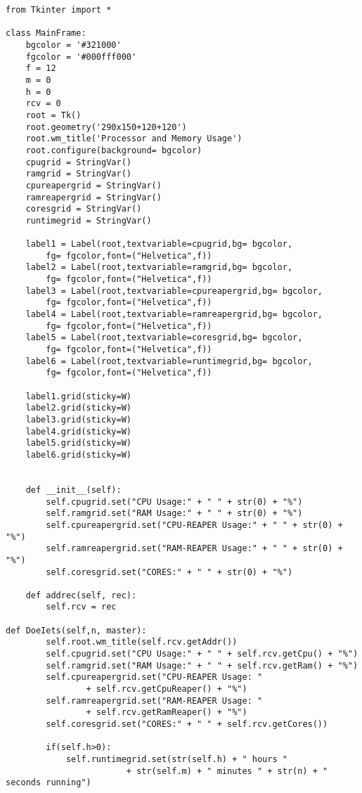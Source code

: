 \documentclass[DIV=calc]{scrartcl}
\begin{document}
\begin{lstlisting}[caption={pyhtonUI.py}, label=UI van het processor- en geheugengebruik van de server]
from Tkinter import *
 
class MainFrame:    
    bgcolor = '#321000'
    fgcolor = '#000fff000'
    f = 12
    m = 0
    h = 0
    rcv = 0
    root = Tk()
    root.geometry('290x150+120+120')
    root.wm_title('Processor and Memory Usage')
    root.configure(background= bgcolor)
    cpugrid = StringVar()
    ramgrid = StringVar()
    cpureapergrid = StringVar()
    ramreapergrid = StringVar()
    coresgrid = StringVar()
    runtimegrid = StringVar()
 
    label1 = Label(root,textvariable=cpugrid,bg= bgcolor,
		fg= fgcolor,font=("Helvetica",f))
    label2 = Label(root,textvariable=ramgrid,bg= bgcolor,
		fg= fgcolor,font=("Helvetica",f))
    label3 = Label(root,textvariable=cpureapergrid,bg= bgcolor,
		fg= fgcolor,font=("Helvetica",f))
    label4 = Label(root,textvariable=ramreapergrid,bg= bgcolor,
		fg= fgcolor,font=("Helvetica",f))
    label5 = Label(root,textvariable=coresgrid,bg= bgcolor,
		fg= fgcolor,font=("Helvetica",f))
    label6 = Label(root,textvariable=runtimegrid,bg= bgcolor,
		fg= fgcolor,font=("Helvetica",f))
 
    label1.grid(sticky=W)
    label2.grid(sticky=W)
    label3.grid(sticky=W)
    label4.grid(sticky=W)
    label5.grid(sticky=W)
    label6.grid(sticky=W)
 
 
    def __init__(self):
        self.cpugrid.set("CPU Usage:" + " " + str(0) + "%")
        self.ramgrid.set("RAM Usage:" + " " + str(0) + "%")
        self.cpureapergrid.set("CPU-REAPER Usage:" + " " + str(0) + "%")
        self.ramreapergrid.set("RAM-REAPER Usage:" + " " + str(0) + "%")
        self.coresgrid.set("CORES:" + " " + str(0) + "%")
 
    def addrec(self, rec):
        self.rcv = rec
 
def DoeIets(self,n, master):       
        self.root.wm_title(self.rcv.getAddr())
        self.cpugrid.set("CPU Usage:" + " " + self.rcv.getCpu() + "%")
        self.ramgrid.set("RAM Usage:" + " " + self.rcv.getRam() + "%")
        self.cpureapergrid.set("CPU-REAPER Usage: " 
				+ self.rcv.getCpuReaper() + "%")
        self.ramreapergrid.set("RAM-REAPER Usage: " 
				+ self.rcv.getRamReaper() + "%")
        self.coresgrid.set("CORES:" + " " + self.rcv.getCores())
 
        if(self.h>0):
            self.runtimegrid.set(str(self.h) + " hours " 
						+ str(self.m) + " minutes " + str(n) + " seconds running")
 

\end{lstlisting}
\end{document}
